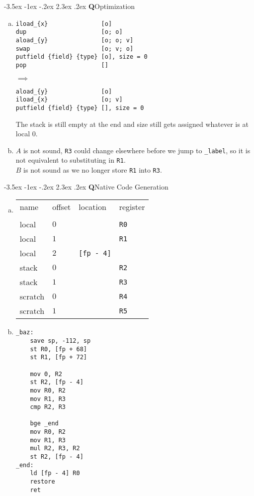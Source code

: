 \documentclass[12pt]{article}
\makeatletter
\renewcommand\section{\@startsection{section}{1}{\z@}%
  {-3.5ex \@plus -1ex \@minus -.2ex}%
                                       {2.3ex \@plus.2ex}%
                                       {\normalfont\bfseries Q}}
\makeatother
\begin{document}
\section{Optimization}
\begin{enumerate}[(a)]
\item
  \begin{minipage}{0.5\linewidth}
\begin{verbatim}
iload_{x}               [o]
dup                     [o; o]
aload_{y}               [o; o; v]
swap                    [o; v; o]
putfield {field} {type} [o], size = 0
pop                     []
\end{verbatim}
  \end{minipage}
  $\implies$ \hspace{1 em}
  \begin{minipage}{0.5\linewidth}
\begin{verbatim}
aload_{y}               [o]
iload_{x}               [o; v]
putfield {field} {type} [], size = 0
\end{verbatim}
  \end{minipage}
  The stack is still empty at the end and size still gets assigned
  whatever is at local $0$.

\item $A$ is not sound, \texttt{R3} could change elsewhere before we
  jump to \texttt{\_label}, so it is not equivalent to substituting in \texttt{R1}.
  \\ $B$ is not sound as we no longer store \texttt{R1} into \texttt{R3}.
\end{enumerate}

\section{Native Code Generation}
\begin{enumerate}[(a)]
\item
\begin{tabular}{l l l l}
  name&offset&location&register
  \\
  \\ local & $0$ & & \texttt{R0}
  \\ local & $1$ & & \texttt{R1}
  \\ local & $2$ & \texttt{[fp - 4]}
  \\ stack & $0$ & & \texttt{R2}
  \\ stack & $1$ & & \texttt{R3}
  \\ scratch & $0$ & & \texttt{R4}
  \\ scratch & $1$ & & \texttt{R5}
\end{tabular}
\item
\begin{verbatim}
_baz:
    save sp, -112, sp
    st R0, [fp + 68]
    st R1, [fp + 72]

    mov 0, R2
    st R2, [fp - 4]
    mov R0, R2
    mov R1, R3
    cmp R2, R3

    bge _end
    mov R0, R2
    mov R1, R3
    mul R2, R3, R2
    st R2, [fp - 4]
_end:
    ld [fp - 4] R0
    restore
    ret
\end{verbatim}
\end{enumerate}
\end{document}
